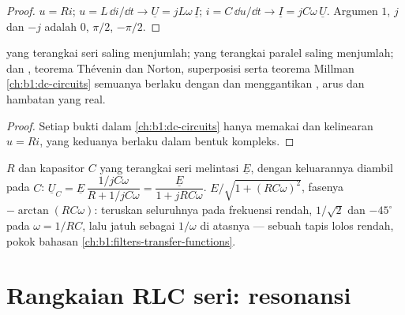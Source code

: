 \begin{proof}
$u = Ri$; $u = L\,\dd i/\dd t \to \underline U = jL\omega\,\underline I$;
$i = C\,\dd u/\dd t \to \underline I = jC\omega\,\underline U$. Argumen
$1$, $j$ dan $-j$ adalah $0$, $\pi/2$, $-\pi/2$.
\end{proof}

\begin{proposition}\label{prop:b1:sinusoidal-impedance:assoc}
 yang terangkai seri saling menjumlah;  yang terangkai
paralel saling menjumlah;  dan , teorema
Thévenin dan Norton, superposisi serta teorema Millman
\cref{ch:b1:dc-circuits} semuanya berlaku dengan  dan
 menggantikan , arus dan hambatan yang real.
\end{proposition}

\begin{proof}
Setiap bukti dalam \cref{ch:b1:dc-circuits} hanya memakai  dan kelinearan $u = Ri$, yang keduanya berlaku dalam bentuk kompleks.
\end{proof}

\begin{example}[Pembagi RC]\label{ex:b1:sinusoidal-impedance:rcdivider}
 $R$ dan kapasitor $C$ yang terangkai seri melintasi
$\underline E$, dengan keluarannya diambil pada $C$:
$\underline U_C = \underline E\,\dfrac{1/jC\omega}
{R + 1/jC\omega} = \dfrac{\underline E}{1 + jRC\omega}$. 
$E/\sqrt{1 + (RC\omega)^2}$, fasenya $-\arctan(RC\omega)$: teruskan
seluruhnya pada frekuensi rendah, $1/\sqrt2$ dan $-45^\circ$ pada
$\omega = 1/RC$, lalu jatuh sebagai $1/\omega$ di atasnya --- sebuah
tapis lolos rendah, pokok bahasan \cref{ch:b1:filters-transfer-functions}.
\end{example}

\section{Rangkaian RLC seri: resonansi}

